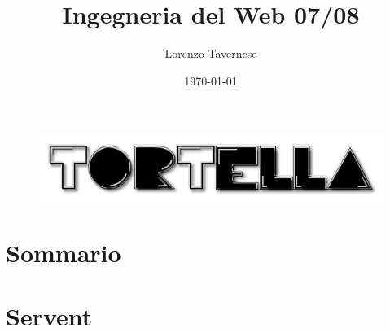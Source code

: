 \documentclass[a4paper,italian,12pt]{beamer}
\title{Ingegneria del Web 07/08}
\institute{Università di Roma Tor Vergata}
\author{Lorenzo Tavernese}
\date{\today}
\begin{document}
	\begin{frame}
		\titlepage
		\begin{figure}[H]
			\begin{center}
				\includegraphics[scale=0.4]{etc/tortellalogo.jpg}
			\end{center}
		\end{figure}
	\end{frame}

    \section{Sommario}
	    \frame{\tableofcontents}

	\section{Servent}
\end{document}
